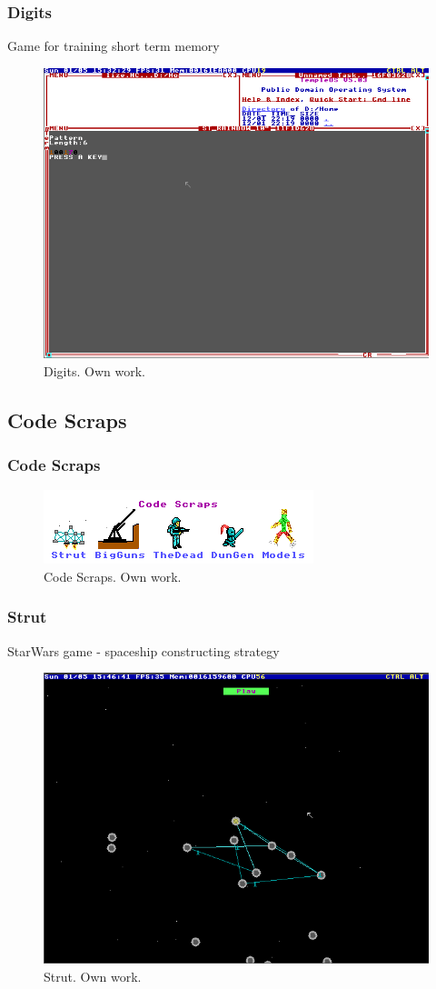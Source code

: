 \documentclass{beamer}
\begin{document}
	\begin{frame}
		\frametitle{Digits}
		Game for training short term memory
		\begin{figure}
			\centering
			\includegraphics[width=0.6\linewidth]{images/digits.png}
			\caption{Digits. Own work.}
			\label{fig:digits}
		\end{figure}
	\end{frame}

	\subsection{Code Scraps}
	\begin{frame}
		\frametitle{Code Scraps}
		\begin{figure}
			\centering
			\includegraphics[width=0.5\linewidth]{images/code_scraps.png}
			\caption{Code Scraps. Own work.}
			\label{fig:code_scraps}
		\end{figure}
	\end{frame}

	\begin{frame}
		\frametitle{Strut}
		StarWars game - spaceship constructing strategy
		\begin{figure}
			\centering
			\includegraphics[width=0.6\linewidth]{images/strut.png}
			\caption{Strut. Own work.}
			\label{fig:strut}
		\end{figure}
	\end{frame}
\end{document}
